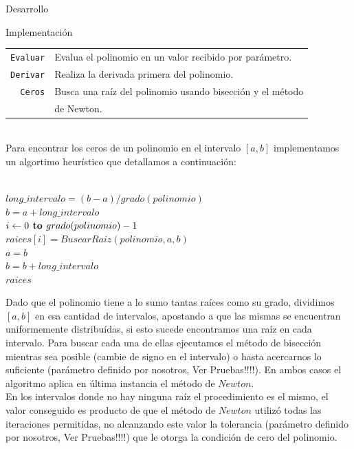 \begin{section}{Desarrollo}
\begin{subsection}{Implementación}
\begin{itemize}
				\begin{tabular}{rl}
					\texttt{Evaluar} & Evalua el polinomio en un valor recibido por parámetro.\\
					\texttt{Derivar} & Realiza la derivada primera del polinomio.\\
					\texttt{Ceros}   & Busca una raíz del polinomio usando bisección y el método\\
									 & de Newton.\\
				\end{tabular}\\ 
				
				Para encontrar los ceros de un polinomio en el intervalo $[a,b]$ implementamos un algortimo heurístico que detallamos a continuación:\\
				
				\begin{pseudo}
					\\
					\tab $long\_intervalo = (b-a)/grado(polinomio)$\\
					\tab $b = a+long\_intervalo$\\
					\tab \FOR $i\gets 0 \textbf{ to } grado(polinomio)-1$\\
					\tab\tab\tab $raices[i] = BuscarRaiz(polinomio,a,b)$\\
					\tab\tab\tab $a = b$\\
					\tab\tab\tab $b = b + long\_intervalo$\\
					\tab \RET $raices$\\
				\end{pseudo}
		
				Dado que el polinomio tiene a lo sumo tantas raíces como su grado, dividimos $[a,b]$ en esa cantidad de intervalos, apostando a que
				las mismas se encuentran uniformemente distribuídas, si esto sucede encontramos una raíz en cada intervalo. Para buscar cada una de 
				ellas ejecutamos el método de bisección mientras sea posible (cambie de signo en el intervalo) o hasta acercarnos lo suficiente
				(parámetro definido por nosotros, Ver Pruebas!!!!). En ambos casos el algoritmo aplica en última instancia el método de $Newton$.\\
				En los intervalos donde no hay ninguna raíz el procedimiento es el mismo, el valor conseguido es producto de que el método de 
				$Newton$ utilizó todas las iteraciones permitidas, no alcanzando este valor la tolerancia (parámetro definido por nosotros, Ver Pruebas!!!!) que le otorga la condición de cero del
				polinomio.
				

\end{itemize}
\end{subsection}
\end{section}

